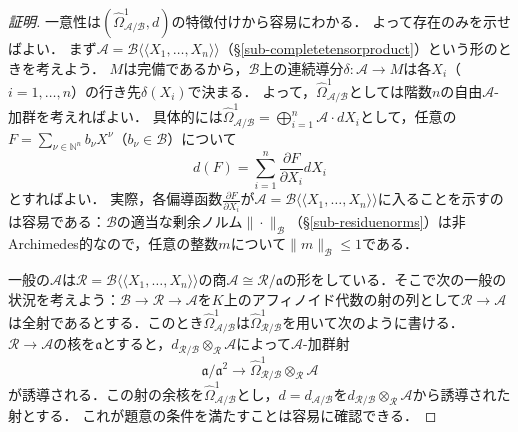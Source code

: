 \documentclass[a4paper,12pt, dvipdfmx]{jsbook}
\def\N{\mathbb{N}}
\def\dl{\langle\!\langle}
\def\dr{\rangle\!\rangle}
\newcommand{\abss}[1]{\|#1\|}
\theoremstyle{plain}
\theoremstyle{definition}
\begin{document}
\begin{proof}[証明]
一意性は$(\widehat{\Omega}^1_{\mathcal{A}/\mathcal{B}},d)$の特徴付けから容易にわかる．
よって存在のみを示せばよい．
まず$\mathcal{A}=\mathcal{B}\dl X_1,\ldots,X_n\dr$（\S\ref{sub-completetensorproduct}）という形のときを考えよう．
$M$は完備であるから，$\mathcal{B}$上の連続導分$\delta\colon\mathcal{A}\rightarrow M$は各$X_i$（$i=1,\ldots,n$）の行き先$\delta(X_i)$で決まる．
よって，$\widehat{\Omega}^1_{\mathcal{A}/\mathcal{B}}$としては階数$n$の自由$\mathcal{A}$-加群を考えればよい．
具体的には$\widehat{\Omega}^1_{\mathcal{A}/\mathcal{B}}=\bigoplus^n_{i=1}\mathcal{A}\cdot dX_i$として，任意の$F=\sum_{\nu\in\N^n}b_{\nu}X^{\nu}$（$b_{\nu}\in\mathcal{B}$）について
$$
d(F)=\sum^n_{i=1}\frac{\partial F}{\partial X_i}dX_i
$$
とすればよい．
実際，各偏導函数$\frac{\partial F}{\partial X_i}$が$\mathcal{A}=\mathcal{B}\dl X_1,\ldots,X_n\dr$に入ることを示すのは容易である：$\mathcal{B}$の適当な剰余ノルム$\abss{\cdot}_{\mathcal{B}}$（\S\ref{sub-residuenorms}）は非Archimedes的なので，任意の整数$m$について$\abss{m}_{\mathcal{B}}\leq 1$である．

一般の$\mathcal{A}$は$\mathcal{R}=\mathcal{B}\dl X_1,\ldots,X_n\dr$の商$\mathcal{A}\cong\mathcal{R}/\mathfrak{a}$の形をしている．そこで次の一般の状況を考えよう：$\mathcal{B}\rightarrow\mathcal{R}\rightarrow\mathcal{A}$を$K$上のアフィノイド代数の射の列として$\mathcal{R}\rightarrow\mathcal{A}$は全射であるとする．このとき$\widehat{\Omega}^1_{\mathcal{A}/\mathcal{B}}$は$\widehat{\Omega}^1_{\mathcal{R}/\mathcal{B}}$を用いて次のように書ける．
$\mathcal{R}\rightarrow\mathcal{A}$の核を$\mathfrak{a}$とすると，$d_{\mathcal{R}/\mathcal{B}}\otimes_{\mathcal{R}}\mathcal{A}$によって$\mathcal{A}$-加群射
$$
\mathfrak{a}/\mathfrak{a}^2\longrightarrow\widehat{\Omega}^1_{\mathcal{R}/\mathcal{B}}\otimes_{\mathcal{R}}\mathcal{A}
$$
が誘導される．この射の余核を$\widehat{\Omega}^1_{\mathcal{A}/\mathcal{B}}$とし，$d=d_{\mathcal{A}/\mathcal{B}}$を$d_{\mathcal{R}/\mathcal{B}}\otimes_{\mathcal{R}}\mathcal{A}$から誘導された射とする．
これが題意の条件を満たすことは容易に確認できる．
\end{proof}
\end{document}
